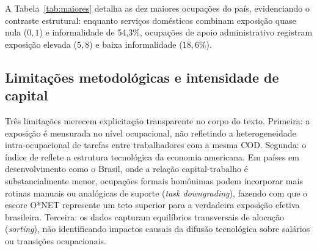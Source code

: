 A Tabela~\ref{tab:maiores} detalha as dez maiores ocupações do país, evidenciando o contraste estrutural: enquanto serviços domésticos combinam exposição quase nula ($0{,}1$) e informalidade de 54{,}3\%, ocupações de apoio administrativo registram exposição elevada ($5{,}8$) e baixa informalidade ($18{,}6\%$).

\begin{table}[htbp]
\centering
\caption{As dez maiores ocupações do Brasil (2026Q1): emprego em milhões, exposição à IA, escolaridade média (anos), informalidade (\%) e rendimento médio (R\$).}
\label{tab:maiores}
\small
{}
\end{table}

\subsection{Limitações metodológicas e intensidade de capital}

Três limitações merecem explicitação transparente no corpo do texto. Primeira: a exposição é mensurada no nível ocupacional, não refletindo a heterogeneidade intra-ocupacional de tarefas entre trabalhadores com a mesma COD. Segunda: o índice de \citet{eloundou2024gpts} reflete a estrutura tecnológica da economia americana. Em países em desenvolvimento como o Brasil, onde a relação capital-trabalho é substancialmente menor, ocupações formais homônimas podem incorporar mais rotinas manuais ou analógicas de suporte (\emph{task downgrading}), fazendo com que o escore O*NET represente um teto superior para a verdadeira exposição efetiva brasileira. Terceira: os dados capturam equilíbrios transversais de alocação (\emph{sorting}), não identificando impactos causais da difusão tecnológica sobre salários ou transições ocupacionais.
